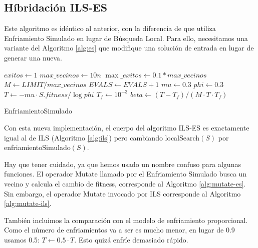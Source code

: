 \documentclass{article}
\begin{document}
\subsection{Híbridación ILS-ES}

Este algoritmo es idéntico al anterior, con la diferencia de que utiliza Enfriamiento Simulado en lugar de Búsqueda Local.
Para ello, necesitamos una variante del Algoritmo \ref{alg:es} que modifique una solución de entrada en lugar de generar una
nueva.

\begin{algorithm}[H]
	\DontPrintSemicolon %
	$exitos\gets 1$ 
	$max\_vecinos\gets 10n$\;
	$\max\_exitos\gets 0.1*max\_vecinos$\;
	$M\gets LIMIT/max\_vecinos$\;
	$EVALS\gets EVALS+1$\;
	$mu\gets 0.3$\;
	$phi\gets 0.3$\;
	$T\gets -mu\cdot S.fitness/\log phi$ 
	$T_f\gets 10^{-3}$\;
	$beta\gets (T-T_f)/(M\cdot T\cdot T_f)$\;
	\;
	\caption{{\sc EnfriamientoSimulado}}
	\label{alg:es-ils}
\end{algorithm}

Con esta nueva implementación, el cuerpo del algoritmo ILS-ES es exactamente igual al de ILS (Algoritmo \ref{alg:ils}) pero
cambiando localSearch$(S)$ por enfriamientoSimulado$(S)$.

Hay que tener cuidado, ya que hemos usado un nombre confuso para algunas funciones. El operador Mutate llamado por el Enfriamiento
Simulado busca un vecino y calcula el cambio de fitness, corresponde al Algoritmo \ref{alg:mutate-es}. Sin embargo, el operador
Mutate invocado por ILS corresponde al Algoritmo \ref{alg:mutate-ils}.

También incluimos la comparación con el modelo de enfriamiento proporcional. Como el número de enfriamientos va a ser es mucho menor,
en lugar de 0.9 usamos 0.5: $T\gets 0.5\cdot T$. Esto quizá enfríe demasiado rápido.
\end{document}
